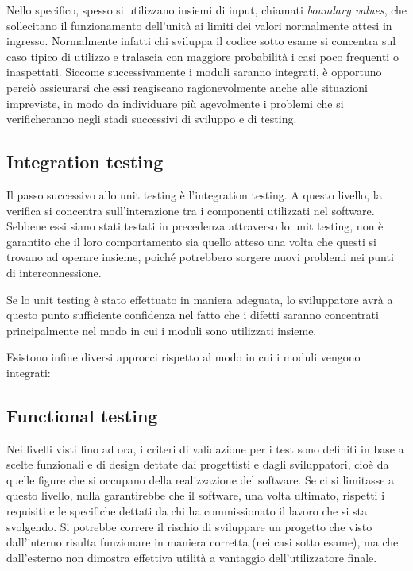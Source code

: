 \documentclass[12pt]{toptesi}
\begin{document}
Nello specifico, spesso si utilizzano insiemi di input, chiamati \emph{boundary values}, che sollecitano il funzionamento dell'unità ai limiti dei valori normalmente attesi in ingresso. 
Normalmente infatti chi sviluppa il codice sotto esame si concentra sul caso tipico di utilizzo e tralascia con maggiore probabilità i casi poco frequenti o inaspettati. Siccome successivamente i moduli saranno integrati, è opportuno perciò assicurarsi che essi reagiscano ragionevolmente anche alle situazioni impreviste, in modo da individuare più agevolmente i problemi che si verificheranno negli stadi successivi di sviluppo e di testing.


\subsection{Integration testing}

Il passo successivo allo unit testing è l'integration testing. A questo livello, la verifica si concentra sull'interazione tra i componenti utilizzati nel software. Sebbene essi siano stati testati in precedenza attraverso lo unit testing, non è garantito che il loro comportamento sia quello atteso una volta che questi si trovano ad operare insieme, poiché potrebbero sorgere nuovi problemi nei punti di interconnessione.

Se lo unit testing è stato effettuato in maniera adeguata, lo sviluppatore avrà a questo punto sufficiente confidenza nel fatto che i difetti saranno concentrati principalmente nel modo in cui i moduli sono utilizzati insieme.

Esistono infine diversi approcci rispetto al modo in cui i moduli vengono integrati: %

\subsection{Functional testing}

Nei livelli visti fino ad ora, i criteri di validazione per i test sono definiti in base a scelte funzionali e di design dettate dai progettisti e dagli sviluppatori, cioè da quelle figure che si occupano della realizzazione del software. 
Se ci si limitasse a questo livello, nulla garantirebbe che il software, una volta ultimato, rispetti i requisiti e le specifiche dettati da chi ha commissionato il lavoro che si sta svolgendo. Si potrebbe correre il rischio di sviluppare un progetto
che visto dall'interno risulta funzionare in maniera corretta (nei casi sotto esame), ma che dall'esterno non dimostra effettiva utilità a vantaggio dell'utilizzatore finale.
\end{document}
